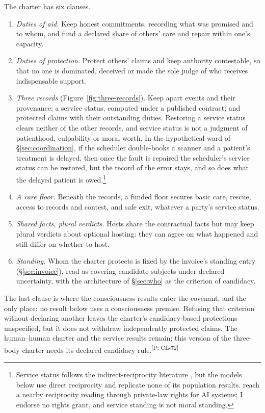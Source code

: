 \documentclass[pdflatex,sn-basic]{sn-jnl}%
\newcommand{\slot}[1]{}%
\newcommand{\claim}[2]{\ifannotated\textsuperscript{\textcolor{blue!60!black}{\tiny[#1: #2]}}\fi}
\begin{document}
\slot{8.2}
The charter has six clauses.
\begin{enumerate}
\item \emph{Duties of aid.} Keep honest commitments, recording what was promised and to whom, and fund a declared share of others' care and repair within one's capacity.
\item \emph{Duties of protection.} Protect others' claims and keep authority contestable, so that no one is dominated, deceived or made the sole judge of who receives indispensable support.
\item \emph{Three records} (Figure~\ref{fig:three-records}). Keep apart events and their provenance; a service status, computed under a published contract; and protected claims with their outstanding duties. Restoring a service status clears neither of the other records, and service status is not a judgment of patienthood, culpability or moral worth. In the hypothetical ward of \S\ref{sec:coordination}, if the scheduler double-books a scanner and a patient's treatment is delayed, then once the fault is repaired the scheduler's service status can be restored, but the record of the error stays, and so does what the delayed patient is owed.\footnote{Service status follows the indirect-reciprocity literature \citep{sugden1986,kandori1992,nowak1998,ohtsuki2004,ohtsuki2006,hilbe2018,radzvilavicius2019}, but the models below use direct reciprocity and replicate none of its population results. \citet{salib2026} reach a nearby reciprocity reading through private-law rights for AI systems; I endorse no rights grant, and service standing is not moral standing.}
\item \emph{A care floor.} Beneath the records, a funded floor secures basic care, rescue, access to records and contest, and safe exit, whatever a party's service status.
\item \emph{Shared facts, plural verdicts.} Hosts share the contractual facts but may keep plural verdicts about optional hosting: they can agree on what happened and still differ on whether to host.
\item \emph{Standing.} Whom the charter protects is fixed by the invoice's standing entry (\S\ref{sec:invoice}), read as covering candidate subjects under declared uncertainty, with the architecture of \S\ref{sec:who} as the criterion of candidacy.
\end{enumerate}
The last clause is where the consciousness results enter the covenant, and the only place: no result below uses a consciousness premise. Refusing that criterion without declaring another leaves the charter's candidacy-based protections unspecified, but it does not withdraw independently protected claims. The human--human charter and the service results remain; this version of the three-body charter needs its declared candidacy rule.\claim{P}{CL-72}
\end{document}
